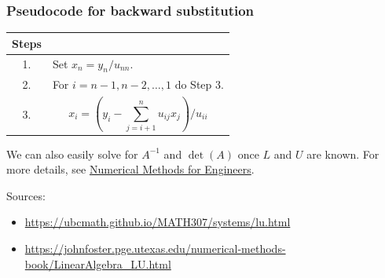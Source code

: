\documentclass[../main.tex]{subfiles}
\begin{document}
\subsubsection*{Pseudocode for backward substitution}
\begin{table}[!htbp]
    \centering
    \renewcommand{\arraystretch}{1.5}
    \begin{tabular}{|c|p{}|}
    \hline
    \textbf{Steps} & \\ \hline
    1. & Set $x_n=y_n/u_{nn}$. \\ \hline
    2. & For $i=n-1,n-2,\ldots,1$ do Step 3. \\ \hline
    3. & \[
    x_i=\left(y_i-\sum_{j=i+1}^{n} u_{ij}x_j\right)\big/u_{ii}
    \] \\ \hline
    \end{tabular}
\end{table}

We can also easily solve for $A^{-1}$ and $\det(A)$ once $L$ and $U$ are known. For more details, see \href{https://johnfoster.pge.utexas.edu/numerical-methods-book/LinearAlgebra_LU.html}{Numerical Methods for Engineers}.


\noindent Sources:
\begin{itemize}
    \item \url{https://ubcmath.github.io/MATH307/systems/lu.html}
    \item \url{https://johnfoster.pge.utexas.edu/numerical-methods-book/LinearAlgebra_LU.html}
\end{itemize}
\end{document}
